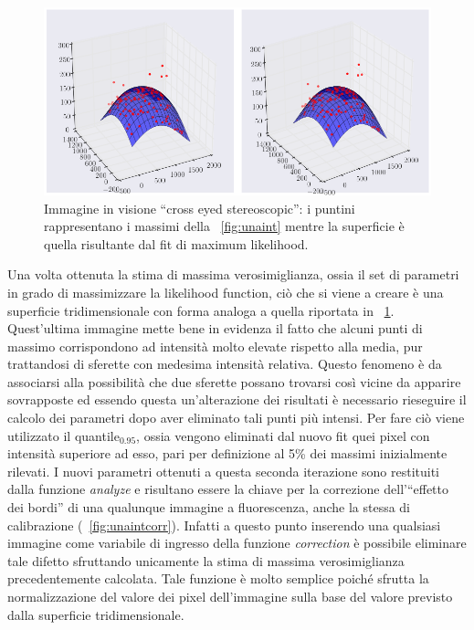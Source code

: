 \begin{figure}
 \centering
 \includegraphics[scale=0.45]{img/CAP3gauss.png}
 \caption{\small{Immagine in visione ``cross eyed stereoscopic'': i puntini rappresentano i massimi della \figurename~\ref{fig:unaint} mentre la superficie è quella risultante dal fit di maximum likelihood.}}
 \label{fig:gauss}
\end{figure}

Una volta ottenuta la stima di massima verosimiglianza, ossia il set di parametri in grado di massimizzare la likelihood function, ciò che si viene a creare è una superficie tridimensionale con forma analoga a quella riportata in \figurename~\ref{fig:gauss}. 
Quest'ultima immagine mette bene in evidenza il fatto che alcuni punti di massimo corrispondono ad intensità molto elevate rispetto alla media, pur trattandosi di sferette con medesima intensità relativa.
Questo fenomeno è da associarsi alla possibilità che due sferette possano trovarsi così vicine da apparire sovrapposte ed essendo questa un'alterazione dei risultati è necessario rieseguire il calcolo dei parametri dopo aver eliminato tali punti più intensi. 
Per fare ciò viene utilizzato il quantile$_{0.95}$, ossia vengono eliminati dal nuovo fit quei pixel con intensità superiore ad esso, pari per definizione al 5\% dei massimi inizialmente rilevati.
I nuovi parametri ottenuti a questa seconda iterazione sono restituiti dalla funzione \textit{analyze} e risultano essere la chiave per la correzione dell'``effetto dei bordi'' di una qualunque immagine a fluorescenza, anche la stessa di calibrazione (\figurename~\ref{fig:unaintcorr}).
Infatti a questo punto inserendo una qualsiasi immagine come variabile di ingresso della funzione \textit{correction} è possibile eliminare tale difetto sfruttando unicamente la stima di massima verosimiglianza precedentemente calcolata. 
Tale funzione è molto semplice poiché sfrutta la normalizzazione del valore dei pixel dell'immagine sulla base del valore previsto dalla superficie tridimensionale.

